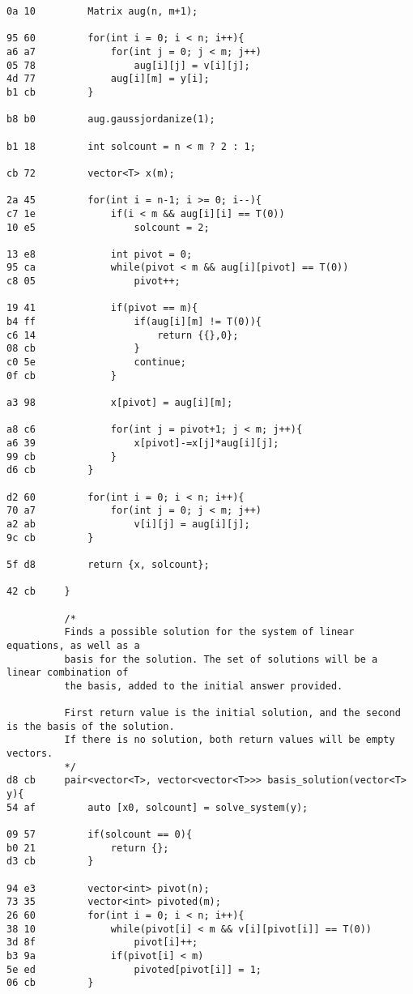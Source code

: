 \documentclass[11pt, a4paper, twoside]{article}
\begin{document}
\begin{lstlisting}
0a 10         Matrix aug(n, m+1);
      
95 60         for(int i = 0; i < n; i++){
a6 a7             for(int j = 0; j < m; j++)
05 78                 aug[i][j] = v[i][j];
4d 77             aug[i][m] = y[i];
b1 cb         }
      
b8 b0         aug.gaussjordanize(1);
      
b1 18         int solcount = n < m ? 2 : 1;
              
cb 72         vector<T> x(m);
      
2a 45         for(int i = n-1; i >= 0; i--){
c7 1e             if(i < m && aug[i][i] == T(0))
10 e5                 solcount = 2;
      
13 e8             int pivot = 0;
95 ca             while(pivot < m && aug[i][pivot] == T(0))
c8 05                 pivot++;
                  
19 41             if(pivot == m){
b4 ff                 if(aug[i][m] != T(0)){
c6 14                     return {{},0};
08 cb                 }
c0 5e                 continue;
0f cb             }
      
a3 98             x[pivot] = aug[i][m];
      
a8 c6             for(int j = pivot+1; j < m; j++){
a6 39                 x[pivot]-=x[j]*aug[i][j];
99 cb             }
d6 cb         }
      
d2 60         for(int i = 0; i < n; i++){
70 a7             for(int j = 0; j < m; j++)
a2 ab                 v[i][j] = aug[i][j];
9c cb         }
      
5f d8         return {x, solcount};
      
42 cb     }
      
          /*
          Finds a possible solution for the system of linear equations, as well as a
          basis for the solution. The set of solutions will be a linear combination of
          the basis, added to the initial answer provided.
      
          First return value is the initial solution, and the second is the basis of the solution.
          If there is no solution, both return values will be empty vectors.
          */
d8 cb     pair<vector<T>, vector<vector<T>>> basis_solution(vector<T> y){
54 af         auto [x0, solcount] = solve_system(y);
      
09 57         if(solcount == 0){
b0 21             return {};
d3 cb         }
      
94 e3         vector<int> pivot(n);
73 35         vector<int> pivoted(m);
26 60         for(int i = 0; i < n; i++){
38 10             while(pivot[i] < m && v[i][pivot[i]] == T(0))
3d 8f                 pivot[i]++;
b3 9a             if(pivot[i] < m)
5e ed                 pivoted[pivot[i]] = 1;
06 cb         }
      

\end{lstlisting}
\end{document}
